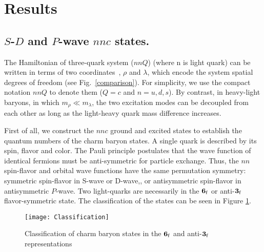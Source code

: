 \documentclass[twocolumn,superscriptaddress,preprintnumbers,nofootinbib]{revtex4}
\begin{document}
\section{Results}
\label{results}
\subsection{$S$-$D$ and $P$-wave $nnc$ states.}
\label{secIIA}
The Hamiltonian of three-quark system ($nnQ$) (where n is light quark)  can be written in terms of two coordinates~\cite{Isgur:1978xj}, $\rho$ and $\lambda$, which encode the system spatial degrees of freedom (see Fig.~\ref{comparison}). For simplicity, we use the compact notation $nnQ$ to denote them ($Q = c$ and $n=u,d,s$). 
By contrast, in heavy-light baryons, in which $m_{\rho} \ll m_{\lambda}$, the two excitation modes can be decoupled from each other as long as the light-heavy quark mass difference increases.

First of all, we construct the $nnc$  ground and excited states to establish the quantum numbers of the charm baryon states. A single quark is described by its spin, flavor and color.
The Pauli principle postulates that the wave function of identical fermions must be anti-symmetric for particle exchange. 
Thus, the $nn$  spin-flavor and orbital wave functions have the same permutation symmetry: symmetric spin-flavor in  S-wave or D-wave,, or antisymmetric spin-flavor  in antisymmetric $P$-wave.
Two light-quarks are necessarily in the ${\bf {6}}_{\rm f}$ or  anti-${\bf {3}}_{\rm f}$  flavor-symmetric state. The classification of the states can be seen in Figure \ref{Classification}.


\begin{figure}[htbp]
\caption{Classification of  charm baryon states in the ${\bf {6}}_{\rm f}$ and  anti-${\bf {3}}_{\rm f}$  representations}
\begin{center}
\texttt{[image: Classification]}
\label{Classification}
\end{center}
\end{figure}  
\end{document}

